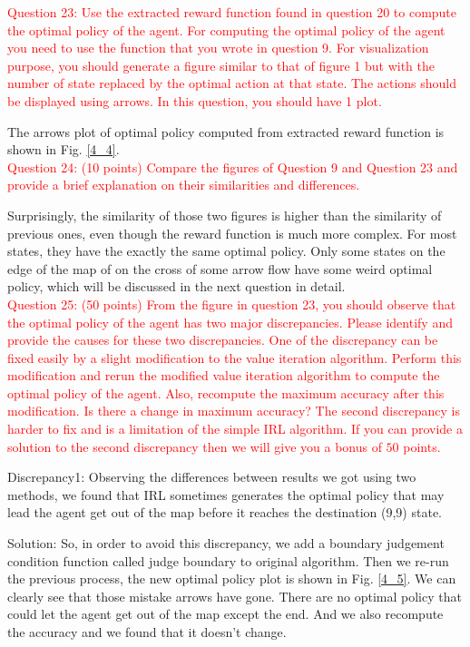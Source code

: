 \documentclass[11pt]{article}
\begin{document}
\textcolor{red}{
    Question 23: Use the extracted reward function found in question 20 to compute the optimal policy of the agent. For computing the optimal policy of the agent you need to use the function that you wrote in question 9. For visualization purpose, you should generate a figure similar to that of figure 1 but with the number of state replaced by the optimal action at that state. The actions should be displayed using arrows. In this question, you should have 1 plot.
}

The arrows plot of optimal policy computed from extracted reward function is shown in Fig. \ref{4_4}.\\

\textcolor{red}{
    Question 24: (10 points) Compare the figures of Question 9 and Question 23 and provide a brief explanation on their similarities and differences.
}

Surprisingly, the similarity of those two figures is higher than the similarity of previous ones, even though the reward function is much more complex. For most states, they have the exactly the same optimal policy. Only some states on the edge of the map of on the cross of some arrow flow have some weird optimal policy, which will be discussed in the next question in detail.\\

\textcolor{red}{
    Question 25: (50 points) From the figure in question 23, you should observe that the optimal policy of the agent has two major discrepancies. Please identify and provide the causes for these two discrepancies. One of the discrepancy can be fixed easily by a slight modification to the value iteration algorithm. Perform this modification and rerun the modified value iteration algorithm to compute the optimal policy of the agent. Also, recompute the maximum accuracy after this modification. Is there a change in maximum accuracy? The second discrepancy is harder to fix and is a limitation of the simple IRL algorithm. If you can provide a solution to the second discrepancy then we will give you a bonus of $50$ points.
}

Discrepancy1: Observing the differences between results we got using two methods, we found that IRL sometimes generates the optimal policy that may lead the agent get out of the map before it reaches the destination (9,9) state.

Solution: So, in order to avoid this discrepancy, we add a boundary judgement condition function called judge boundary to original algorithm. Then we re-run the previous process, the new optimal policy plot is shown in Fig. \ref{4_5}. 
We can clearly see that those mistake arrows have gone. There are no optimal policy that could let the agent get out of the map except the end. And we also recompute the accuracy and we found that it doesn't change.
\end{document}

